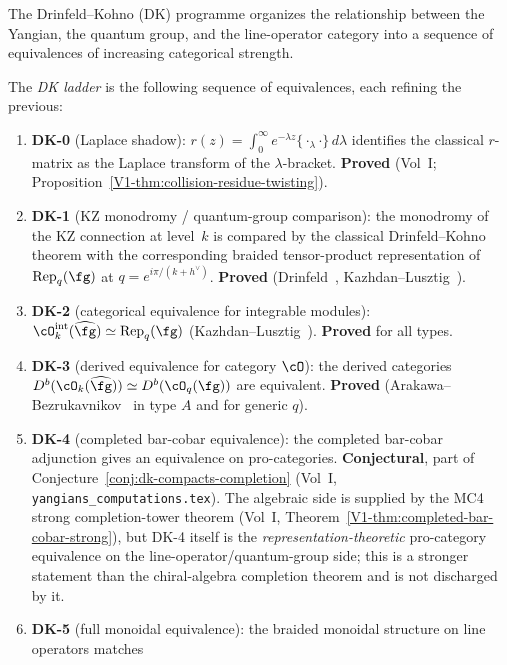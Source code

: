 The Drinfeld--Kohno (DK) programme organizes the relationship
between the Yangian, the quantum group, and the line-operator
category into a sequence of equivalences of increasing
categorical strength.

\begin{definition}[DK levels]
The \emph{DK ladder} is the following sequence of
equivalences, each refining the previous:
\begin{enumerate}[label=\textup{DK-\arabic*.}]
\item \textbf{DK-0} (Laplace shadow):
 $r(z)=\int_0^\infty e^{-\lambda z}\{\cdot_\lambda\cdot\}\,d\lambda$
 identifies the classical $r$-matrix as the Laplace
 transform of the $\lambda$-bracket.
 \textbf{Proved} (Vol~I; Proposition~\ref*{V1-thm:collision-residue-twisting}).
\item \textbf{DK-1} (KZ monodromy / quantum-group comparison):
 the monodromy of the KZ connection at level~$k$ is compared by
 the classical Drinfeld--Kohno theorem with the corresponding
 braided tensor-product representation of
 $\mathrm{Rep}_q(\fg)$ at $q=e^{i\pi/(k+h^\vee)}$.
 \textbf{Proved} (Drinfeld~\cite{Dri89},
 Kazhdan--Lusztig~\cite{KL93}).
\item \textbf{DK-2} (categorical equivalence for integrable
 modules):
 $\cO_k^{\mathrm{int}}(\widehat{\fg})
 \simeq\mathrm{Rep}_q(\fg)$
 (Kazhdan--Lusztig~\cite{KL93}).
 \textbf{Proved} for all types.
\item \textbf{DK-3} (derived equivalence for category
 $\cO$): the derived categories
 $D^b(\cO_k(\widehat{\fg}))
 \simeq D^b(\cO_q(\fg))$
 are equivalent.
 \textbf{Proved} (Arakawa--Bezrukavnikov~\cite{AB09}
 in type $A$ and for generic $q$).
\item \textbf{DK-4} (completed bar-cobar equivalence):
 the completed bar-cobar adjunction gives an equivalence
 on pro-categories.
 \textbf{Conjectural}, part of
 Conjecture~\ref{conj:dk-compacts-completion}
 (Vol~I, \texttt{yangians\_computations.tex}).
 The algebraic side is supplied by the MC4 strong
 completion-tower theorem
 (Vol~I, Theorem~\ref*{V1-thm:completed-bar-cobar-strong}),
 but DK-4 itself is the \emph{representation-theoretic}
 pro-category equivalence on the line-operator/quantum-group
 side; this is a stronger statement than the chiral-algebra
 completion theorem and is not discharged by it.
\item \textbf{DK-5} (full monoidal equivalence):
 the braided monoidal structure on line operators matches

\end{enumerate}
\end{definition}
